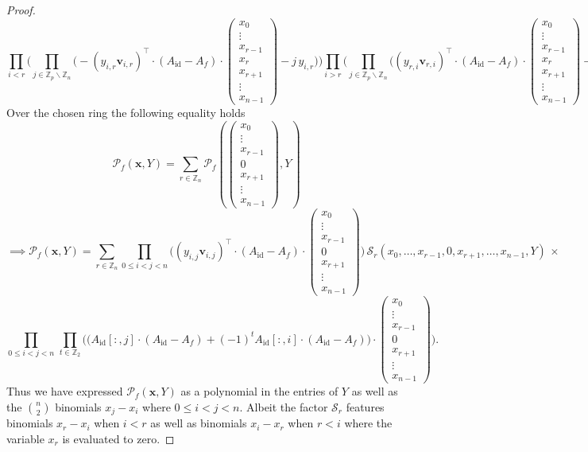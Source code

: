 \begin{proof}
\[\]
\[
\prod_{i<r}\bigg(\prod_{j\in\mathbb{Z}_{p}\backslash\mathbb{Z}_{n}}\big(-(y_{i,r}\mathbf{v}_{i,r})^{\top}\cdot(A_{\text{id}}-A_{f})\cdot\left(\begin{array}{c}
x_{0}\\
\vdots\\
x_{r-1}\\
x_{r}\\
x_{r+1}\\
\vdots\\
x_{n-1}
\end{array}\right)-j\,y_{i,r}\big)\bigg)\prod_{i>r}\bigg(\prod_{j\in\mathbb{Z}_{p}\backslash\mathbb{Z}_{n}}\big((y_{r,i}\mathbf{v}_{r,i})^{\top}\cdot(A_{\text{id}}-A_{f})\cdot\left(\begin{array}{c}
x_{0}\\
\vdots\\
x_{r-1}\\
x_{r}\\
x_{r+1}\\
\vdots\\
x_{n-1}
\end{array}\right)-j\,y_{r,i}\big)\bigg)
\]
Over the chosen ring the following equality holds
\[
\mathcal{P}_{f}(\mathbf{x},Y)=\sum_{r\in\mathbb{Z}_{n}}\mathcal{P}_{f}(\left(\begin{array}{c}
x_{0}\\
\vdots\\
x_{r-1}\\
0\\
x_{r+1}\\
\vdots\\
x_{n-1}
\end{array}\right),Y)
\]
\[
\implies \mathcal{P}_{f}(\mathbf{x},Y)=\sum_{r\in\mathbb{Z}_{n}}\prod_{0\le i<j<n}\big((y_{i,j}\mathbf{v}_{i,j})^{\top}\cdot(A_{\text{id}}-A_{f})\cdot\left(\begin{array}{c}
x_{0}\\
\vdots\\
x_{r-1}\\
0\\
x_{r+1}\\
\vdots\\
x_{n-1}
\end{array}\right)\big)\,\mathcal{S}_{r}(x_{0},\ldots,x_{r-1},0,x_{r+1},\ldots,x_{n-1},Y)\,\times
\]
\[
\prod_{0\le i<j<n}\,\prod_{t\in\mathbb{Z}_{2}}\bigg(\big(A_{\text{id}}[:,j]\cdot(A_{\text{id}}-A_{f})+(-1)^{t}A_{\text{id}}[:,i]\cdot(A_{\text{id}}-A_{f})\big)\cdot\left(\begin{array}{c}
x_{0}\\
\vdots\\
x_{r-1}\\
0\\
x_{r+1}\\
\vdots\\
x_{n-1}
\end{array}\right)\bigg).
\]
Thus we have expressed $\mathcal{P}_{f}(\mathbf{x},Y)$ as a polynomial in the entries of $Y$ as well as the ${n \choose 2}$ binomials $x_j-x_i$ where $0\le i<j<n$. Albeit the factor $\mathcal{S}_r$ features binomials $x_r-x_i$ when $i<r$ as well as binomials $x_i-x_r$ when $r<i$ where the variable $x_r$ is evaluated to zero. 


\end{proof}
